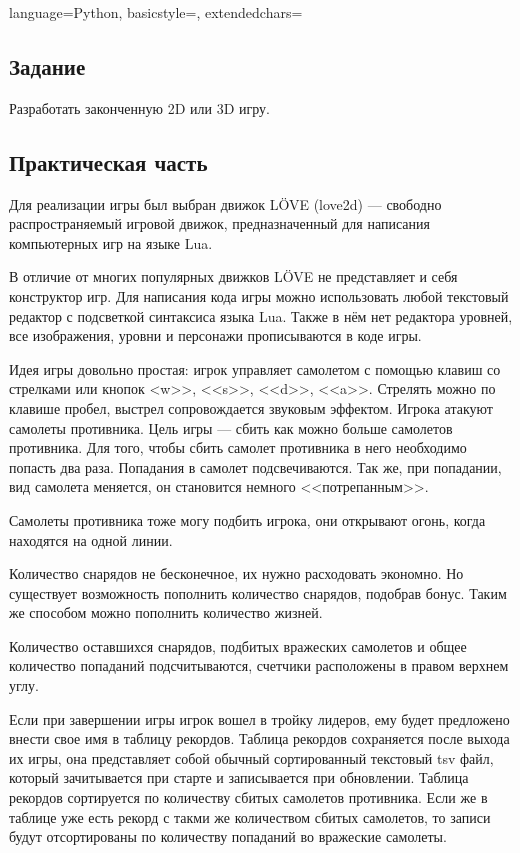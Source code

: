 \documentclass[12pt]{article}
\begin{document}

\lstset
{
        language=Python,
        basicstyle=\footnotesize,%
        extendedchars=\true
}

\subsection*{Задание}

Разработать законченную 2D или 3D игру.

\subsection*{Практическая часть}
Для реализации игры был выбран движок LÖVE (love2d) --- свободно распространяемый игровой движок,
предназначенный для написания компьютерных игр на языке Lua.

В отличие от многих популярных движков LÖVE не представляет и себя конструктор игр.
Для написания кода игры можно использовать любой текстовый редактор с подсветкой синтаксиса языка Lua.
Также в нём нет редактора уровней, все изображения, уровни и персонажи прописываются в коде игры.~\cite{love}

Идея игры довольно простая: игрок управляет самолетом с помощью клавиш со стрелками или кнопок
<w>>, <<s>>, <<d>>, <<a>>. Стрелять можно по клавише пробел, выстрел сопровождается звуковым эффектом.
Игрока атакуют самолеты противника. Цель игры --- сбить как можно больше
самолетов противника. Для того, чтобы сбить самолет противника в него необходимо попасть два раза.
Попадания в самолет подсвечиваются. Так же, при попадании, вид самолета меняется, он становится
немного <<потрепанным>>.

Самолеты противника тоже могу подбить игрока, они открывают огонь, когда находятся на одной
линии.

Количество снарядов не бесконечное, их нужно расходовать экономно. Но существует возможность
пополнить количество снарядов, подобрав бонус. Таким же способом можно пополнить количество
жизней.

Количество оставшихся снарядов, подбитых вражеских самолетов и общее количество попаданий
подсчитываются, счетчики расположены в правом верхнем углу.

Если при завершении игры игрок вошел в тройку лидеров, ему будет предложено внести свое
имя в таблицу рекордов.
Таблица рекордов сохраняется после выхода их игры, она представляет собой обычный
сортированный текстовый tsv файл, который зачитывается при старте и записывается при
обновлении. Таблица рекордов сортируется по количеству сбитых самолетов противника.
Если же в таблице уже есть рекорд с такми же количеством сбитых самолетов, то записи
будут отсортированы по количеству попаданий во вражеские самолеты.
\end{document}

